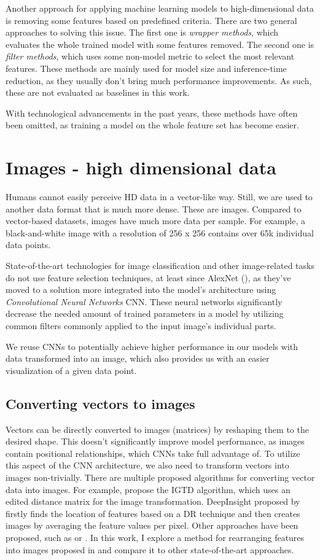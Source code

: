 Another approach for applying machine learning models to high-dimensional data is removing some features based on predefined criteria. There are two general approaches to solving this issue. The first one is \textit{wrapper methods}, which evaluates the whole trained model with some features removed. The second one is \textit{filter methods}, which uses some non-model metric to select the most relevant features. These methods are mainly used for model size and inference-time reduction, as they usually don't bring much performance improvements. As such, these are not evaluated as baselines in this work.

With technological advancements in the past years, these methods have often been omitted, as training a model on the whole feature set has become easier.

\section{Images - high dimensional data}
Humans cannot easily perceive HD data in a vector-like way. Still, we are used to another data format that is much more dense. These are images. Compared to vector-based datasets, images have much more data per sample. For example, a black-and-white image with a resolution of 256 x 256 contains over 65k individual data points. 

State-of-the-art technologies for image classification and other image-related tasks do not use feature selection techniques, at least since AlexNet (\cite{AlexNet}), as they've moved to a solution more integrated into the model's architecture using \textit{Convolutional Neural Networks} \ac{CNN}. These neural networks significantly decrease the needed amount of trained parameters in a model by utilizing common filters commonly applied to the input image's individual parts.

We reuse CNNs to potentially achieve higher performance in our models with data transformed into an image, which also provides us with an easier visualization of a given data point. 

\subsection{Converting vectors to images}
Vectors can be directly converted to images (matrices) by reshaping them to the desired shape. This doesn't significantly improve model performance, as images contain positional relationships, which \ac{CNN}s take full advantage of. To utilize this aspect of the CNN architecture, we also need to transform vectors into images non-trivially. There are multiple proposed algorithms for converting vector data into images. For example, \cite{Zhu2021} propose the IGTD algorithm, which uses an edited distance matrix for the image transformation. DeepInsight proposed by \cite{Sharma2019} firstly finds the location of features based on a DR technique and then creates images by averaging the feature values per pixel. Other approaches have been proposed, such as \cite{omicsmapnet} or \cite{Shneiderman1992}. In this work, I explore a method for rearranging features into images proposed in \cite{REFINED} and compare it to other state-of-the-art approaches.

